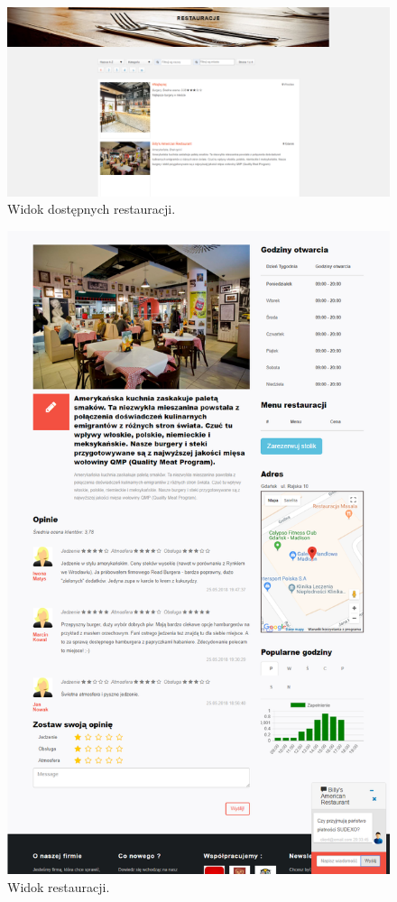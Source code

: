 \documentclass{article}
\begin{document}
\begin{figure}[H]
\centering
	\includegraphics[width=1.00\textwidth]{screens/restaurants.png}
	\caption[caption]{Widok dostępnych restauracji.}
	\label{fig:restaurants}
\end{figure}

\begin{figure}[H]
\centering
	\includegraphics[width=1.00\textwidth]{screens/restaurant.png}
	\caption[caption]{Widok restauracji.}
	\label{fig:restaurant}
\end{figure}
\end{document}
